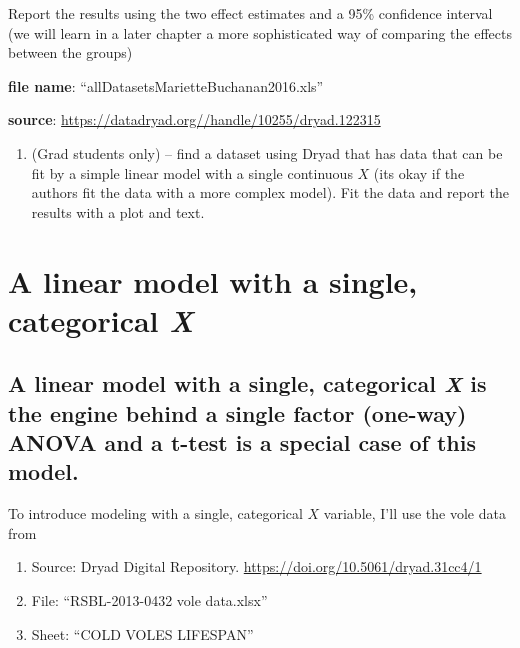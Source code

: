 \documentclass[]{book}
\providecommand{\tightlist}{%
  \setlength{\itemsep}{0pt}\setlength{\parskip}{0pt}}
\begin{document}
Report the results using the two effect estimates and a 95\% confidence
interval (we will learn in a later chapter a more sophisticated way of
comparing the effects between the groups)

\textbf{file name}: ``allDatasetsMarietteBuchanan2016.xls''

\textbf{source}: \url{https://datadryad.org//handle/10255/dryad.122315}

\begin{enumerate}
\def\labelenumi{\arabic{enumi}.}
\setcounter{enumi}{1}
\tightlist
\item
  (Grad students only) -- find a dataset using Dryad that has data that
  can be fit by a simple linear model with a single continuous \(X\)
  (its okay if the authors fit the data with a more complex model). Fit
  the data and report the results with a plot and text.
\end{enumerate}

\chapter{\texorpdfstring{A linear model with a single, categorical
\emph{X}}{A linear model with a single, categorical X}}\label{a-linear-model-with-a-single-categorical-x}

\section{\texorpdfstring{A linear model with a single, categorical
\emph{X} is the engine behind a single factor (one-way) ANOVA and a
t-test is a special case of this
model.}{A linear model with a single, categorical X is the engine behind a single factor (one-way) ANOVA and a t-test is a special case of this model.}}\label{a-linear-model-with-a-single-categorical-x-is-the-engine-behind-a-single-factor-one-way-anova-and-a-t-test-is-a-special-case-of-this-model.}

To introduce modeling with a single, categorical \(X\) variable, I'll
use the vole data from

\begin{enumerate}
\def\labelenumi{\arabic{enumi}.}
\tightlist
\item
  Source: Dryad Digital Repository.
  \url{https://doi.org/10.5061/dryad.31cc4/1}
\item
  File: ``RSBL-2013-0432 vole data.xlsx''
\item
  Sheet: ``COLD VOLES LIFESPAN''
\end{enumerate}
\end{document}
